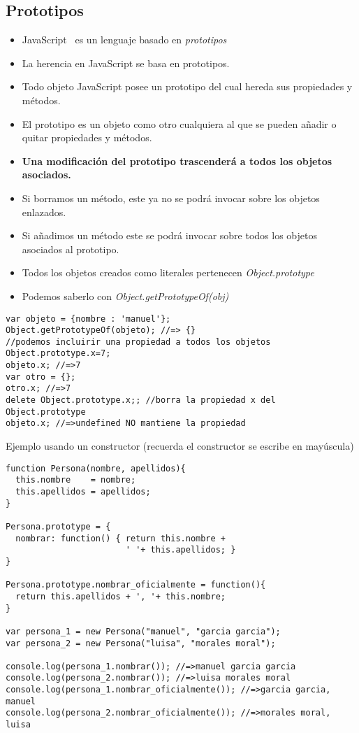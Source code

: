 \documentclass[4paper]{article}
\newcommand{\J}{JavaScript}
\begin{document}
\subsection{Prototipos}
\begin{itemize}
\item \J ~ es un lenguaje basado en \emph{prototipos}
\item La herencia en JavaScript se basa en prototipos.
\item Todo objeto JavaScript posee un prototipo del cual hereda sus propiedades y métodos.
\item El prototipo es un objeto como otro cualquiera al que se pueden añadir o quitar propiedades y métodos.
\item \textbf{Una modificación del prototipo trascenderá a todos los objetos asociados.}
\item Si borramos un método, este ya no se podrá invocar sobre los objetos enlazados.
\item Si añadimos un método este se podrá invocar sobre todos los objetos asociados al prototipo.
\item Todos los objetos creados como literales pertenecen \emph{Object.prototype}
\item Podemos saberlo con \emph{Object.getPrototypeOf(obj)}
\end{itemize}
\begin{lstlisting}
var objeto = {nombre : 'manuel'};
Object.getPrototypeOf(objeto); //=> {} 
//podemos incluirir una propiedad a todos los objetos
Object.prototype.x=7;
objeto.x; //=>7
var otro = {};
otro.x; //=>7
delete Object.prototype.x;; //borra la propiedad x del Object.prototype
objeto.x; //=>undefined NO mantiene la propiedad
\end{lstlisting}

Ejemplo usando un constructor (recuerda el constructor se escribe en mayúscula)
\begin{lstlisting}
function Persona(nombre, apellidos){
  this.nombre    = nombre;
  this.apellidos = apellidos;
}

Persona.prototype = {
  nombrar: function() { return this.nombre +
                        ' '+ this.apellidos; }
}

Persona.prototype.nombrar_oficialmente = function(){
  return this.apellidos + ', '+ this.nombre;
}

var persona_1 = new Persona("manuel", "garcia garcia");
var persona_2 = new Persona("luisa", "morales moral");

console.log(persona_1.nombrar()); //=>manuel garcia garcia
console.log(persona_2.nombrar()); //=>luisa morales moral
console.log(persona_1.nombrar_oficialmente()); //=>garcia garcia, manuel
console.log(persona_2.nombrar_oficialmente()); //=>morales moral, luisa
\end{lstlisting}
\end{document}
